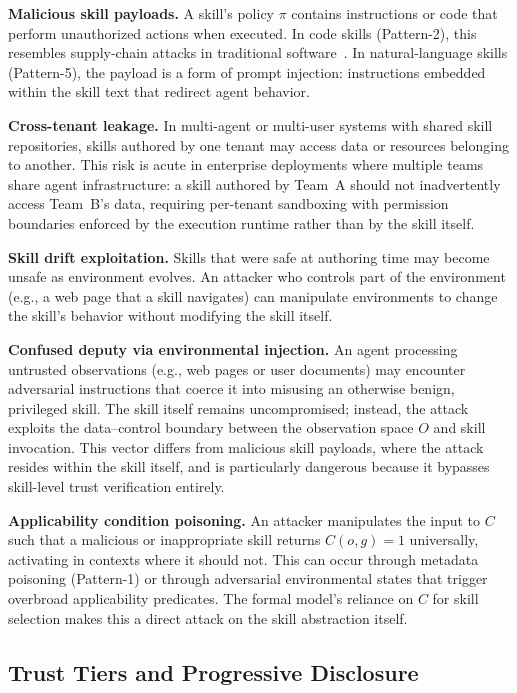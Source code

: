 \documentclass[conference, compsoc]{IEEEtran}
\theoremstyle{plain}
\newcommand{\para}[1]{\smallskip\noindent\textbf{#1.}}
\begin{document}
\para{Malicious skill payloads} A skill's policy $\pi$ contains instructions or code that perform unauthorized actions when executed. In code skills (Pattern-2), this resembles supply-chain attacks in traditional software~\cite{ladisa2023supplychain}. In natural-language skills (Pattern-5), the payload is a form of prompt injection: instructions embedded within the skill text that redirect agent behavior.

\para{Cross-tenant leakage} In multi-agent or multi-user systems with shared skill repositories, skills authored by one tenant may access data or resources belonging to another. This risk is acute in enterprise deployments where multiple teams share agent infrastructure: a skill authored by Team~A should not inadvertently access Team~B's data, requiring per-tenant sandboxing with permission boundaries enforced by the execution runtime rather than by the skill itself.

\para{Skill drift exploitation} Skills that were safe at authoring time may become unsafe as environment evolves. An attacker who controls part of the environment (e.g., a web page that a skill navigates) can manipulate environments to change the skill's behavior without modifying the skill itself.

\para{Confused deputy via environmental injection}
An agent processing untrusted observations (e.g., web pages or user documents) may encounter adversarial instructions that coerce it into misusing an otherwise benign, privileged skill. The skill itself remains uncompromised; instead, the attack exploits the data–control boundary between the observation space $O$ and skill invocation. This vector differs from malicious skill payloads, where the attack resides within the skill itself, and is particularly dangerous because it bypasses skill-level trust verification entirely.

\para{Applicability condition poisoning} An attacker manipulates the input to $C$ such that a malicious or inappropriate skill returns $C(o,g)=1$ universally, activating in contexts where it should not. This can occur through metadata poisoning (Pattern-1) or through adversarial environmental states that trigger overbroad applicability predicates. The formal model's reliance on $C$ for skill selection makes this a direct attack on the skill abstraction itself.

\subsection{Trust Tiers and Progressive Disclosure}
\label{sec:security:trust}
\end{document}
